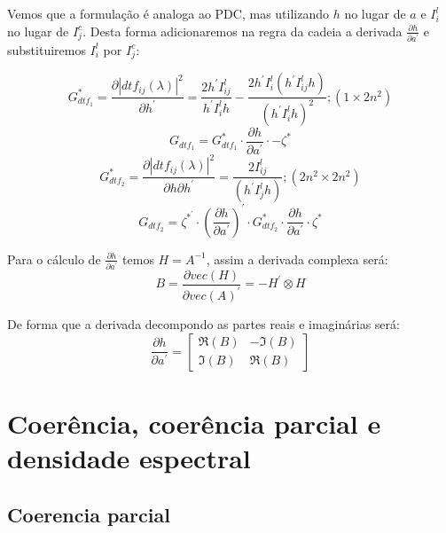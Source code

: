 \documentclass[a4paper,10pt]{article}
\begin{document}
Vemos que a formulação é analoga ao PDC, mas utilizando $h$ no lugar de $a$ e $I_{i}^{l}$ no lugar de $I_{j}^{c}$. Desta forma adicionaremos na regra da cadeia a derivada $\frac{\partial h}{\partial a^{'}}$ e substituiremos $I_{i}^{l}$ por $I_{j}^{c}$:

\begin{equation}
G_{dtf_{1}}^{\ast} = \frac{\partial |dtf_{ij}(\lambda)|^{2}} {\partial h^{'}} = \frac{2 h^{'} I_{ij}^{l}} {h^{'} I_{i}^{l} h} - \frac{2 h^{'} I_{i}^{l} (h^{'} I_{ij}^{l} h)} {(h^{'} I_{i}^{l} h)^{2}}; (1 \times 2n^{2})
\end{equation}
\begin{equation}
G_{dtf_{1}} = G_{dtf_{1}}^{\ast} \cdot \frac{\partial h}{\partial a^{'}} \cdot -\zeta^{\ast} 
\end{equation}
\begin{equation}
G_{dtf_{2}}^{\ast} = \frac{\partial |dtf_{ij}(\lambda)|^{2}} {\partial h \partial h^{'}} = \frac{2 I_{ij}^{l}}{(h^{'} I_{j}^{l} h)}; (2n^{2} \times 2n^{2})
\end{equation}
\begin{equation}
G_{dtf_{2}} = \zeta^{\ast^{'}} \cdot (\frac{\partial h}{\partial a^{'}})^{'} \cdot G_{dtf_{2}}^{\ast} \cdot \frac{\partial h}{\partial a^{'}} \cdot \zeta^{\ast}
\end{equation}

Para o cálculo de $\frac{\partial h}{\partial a^{'}}$ temos $H = A^{-1}$, assim a derivada complexa será:
\begin{equation}
B = \frac{\partial vec(H)}{\partial vec(A)^{'}} = -H^{'} \otimes H
\end{equation}

De forma que a derivada decompondo as partes reais e imaginárias será:
\begin{equation}
\frac{\partial h}{\partial a^{'}} = \left[ \begin{array}{cc} \Re(B) & -\Im(B) \\ \Im(B) & \Re(B)
\end{array} \right]
\end{equation}

\section{Coerência, coerência parcial e densidade espectral}

\subsection{Coerencia parcial}
\end{document}
